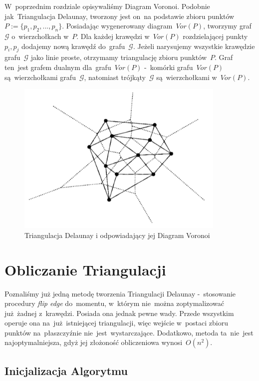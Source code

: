 \documentclass[skorowidz,autorrok,backref,xodstep,oswiadczenie]{wmimgr}
\begin{document}
W~poprzednim rozdziale opisywaliśmy Diagram Voronoi. Podobnie jak~Triangulacja Delaunay, tworzony jest on~na podstawie zbioru punktów~$P:=\{ p_{1},p_{2},...,p_{n} \}$. Posiadając wygenerowany diagram~$Vor(P)$, tworzymy graf~$\mathcal{G}$ o~wierzchołkach w~$P$. Dla każdej krawędzi w~$Vor(P)$ rozdzielającej punkty $p_{i}, p_{j}$ dodajemy nową krawędź do~grafu~$\mathcal{G}$. Jeżeli narysujemy wszystkie krawędzie grafu~$\mathcal{G}$ jako linie proste, otrzymamy triangulację zbioru punktów~$P$. Graf ten~jest grafem dualnym dla~grafu~$Vor(P)$ -~komórki grafu~$Vor(P)$ są~wierzchołkami grafu~$\mathcal{G}$, natomiast trójkąty~$\mathcal{G}$ są~wierzchołkami w~$Vor(P)$.


\begin{figure}[ht!]
\centering
\includegraphics[width=100mm]{images/dualizm.png}
\caption{Triangulacja Delaunay i odpowiadający jej Diagram Voronoi}
\label{duality}
\end{figure}

\section{Obliczanie Triangulacji}

Poznaliśmy już jedną metodę tworzenia Triangulacji Delaunay -~stosowanie procedury \emph{flip edge} do~momentu, w~którym nie~można zoptymalizować już~żadnej z~krawędzi. Posiada ona jednak pewne wady. Przede wszystkim operuje ona na~już~istniejącej triangulacji, więc wejście w~postaci zbioru punktów na~płaszczyźnie nie~jest~wystarczające. Dodatkowo, metoda ta~nie~jest najoptymalniejsza, gdyż jej złożoność obliczeniowa wynosi~$O(n^2)$.

\subsection{Inicjalizacja Algorytmu}
\end{document}
